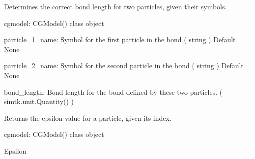 \documentclass[letterpaper,12pt,english,openany,oneside]{sphinxmanual}
\begin{document}
\begin{fulllineitems}
\label{\detokenize{cg_model:cg_model.cgmodel.get_bond_length_from_names}}
Determines the correct bond length for two particles, given their symbols.

cgmodel: CGModel() class object

particle\_1\_name: Symbol for the first particle in the bond
( string )
Default = None

particle\_2\_name: Symbol for the second particle in the bond
( string )
Default = None

bond\_length: Bond length for the bond defined by these two particles.
( simtk.unit.Quantity() )

\end{fulllineitems}


\begin{fulllineitems}
\label{\detokenize{cg_model:cg_model.cgmodel.get_epsilon}}
Returns the epsilon value for a particle, given its index.

cgmodel: CGModel() class object

Epsilon

\end{fulllineitems}

\end{document}

